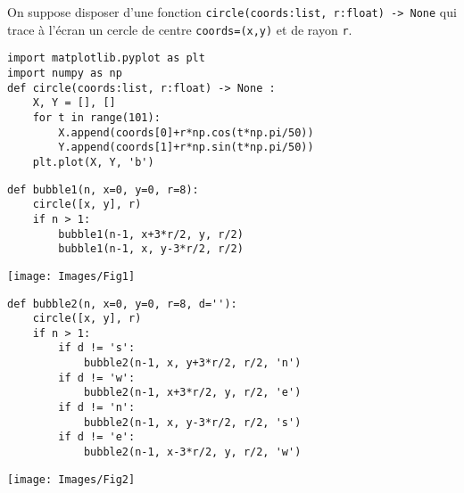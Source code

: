 
 On suppose disposer d’une fonction \texttt{circle(coords:list, r:float) -> None} qui trace à l’écran un cercle de centre 
 \texttt{coords=(x,y)} et de rayon \texttt{r}.
\ifprof\else
\begin{lstlisting}
import matplotlib.pyplot as plt
import numpy as np
def circle(coords:list, r:float) -> None :
    X, Y = [], []
    for t in range(101):
        X.append(coords[0]+r*np.cos(t*np.pi/50))
        Y.append(coords[1]+r*np.sin(t*np.pi/50))
    plt.plot(X, Y, 'b')
\end{lstlisting}
\fi

\ifprof
\begin{lstlisting}
def bubble1(n, x=0, y=0, r=8):
    circle([x, y], r)
    if n > 1:
        bubble1(n-1, x+3*r/2, y, r/2)
        bubble1(n-1, x, y-3*r/2, r/2)
\end{lstlisting}
\else
\begin{center}
\texttt{[image: Images/Fig1]}
\end{center}
\fi
{}
\ifprof
\begin{lstlisting}
def bubble2(n, x=0, y=0, r=8, d=''):
    circle([x, y], r)
    if n > 1:
        if d != 's':
            bubble2(n-1, x, y+3*r/2, r/2, 'n')
        if d != 'w':
            bubble2(n-1, x+3*r/2, y, r/2, 'e')
        if d != 'n':
            bubble2(n-1, x, y-3*r/2, r/2, 's')
        if d != 'e':
            bubble2(n-1, x-3*r/2, y, r/2, 'w')
\end{lstlisting}
\else
\begin{center}
\texttt{[image: Images/Fig2]}
\end{center}
\fi